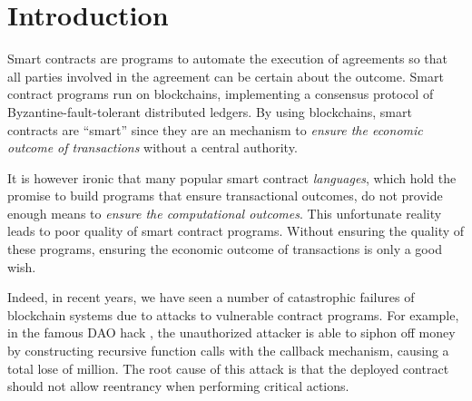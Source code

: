 \section{Introduction} \label{sec:intro}





Smart contracts are programs to automate the execution of agreements so that all
parties involved in the agreement can be certain about the outcome.
Smart contract programs run on blockchains, implementing a consensus
protocol of Byzantine-fault-tolerant distributed ledgers.
By using blockchains, smart contracts are ``smart'' since they are an
mechanism to \emph{ensure the economic outcome of transactions} without a
central authority.

It is however ironic that many popular smart contract \emph{languages}, which hold the
promise to build programs that ensure transactional outcomes,
do not provide enough means to \emph{ensure the computational outcomes}.
This unfortunate reality leads to poor quality of smart contract programs.
Without ensuring the quality of these programs, ensuring the economic outcome
of transactions is only a good wish.

Indeed, in recent years, we have seen a number of catastrophic failures of
blockchain systems due to attacks to vulnerable contract programs.
For example, in the famous DAO hack , the unauthorized attacker is
able to siphon off money by constructing recursive function calls with
the callback mechanism, causing a total lose of  million.
The root cause of this attack is that the deployed contract should
not allow reentrancy when performing critical actions.

